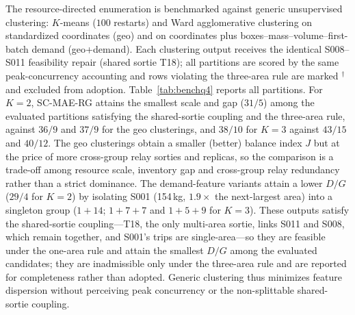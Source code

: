\documentclass[journal]{IEEEtran}
\begin{document}
The resource-directed enumeration is benchmarked against generic unsupervised
clustering: $K$-means ($100$ restarts) and Ward agglomerative clustering on
standardized coordinates (geo) and on coordinates plus
boxes--mass--volume--first-batch demand (geo+demand). Each clustering output
receives the identical S008--S011 feasibility repair (shared sortie T18);
all partitions are scored by the same peak-concurrency accounting and rows
violating the three-area rule are marked
$^{\dagger}$ and excluded from adoption.
Table~\ref{tab:benchq4} reports all partitions. For $K{=}2$,
SC-MAE-RG attains the smallest scale and gap ($31/5$) among the evaluated
partitions satisfying the shared-sortie coupling and the three-area rule,
against $36/9$ and $37/9$ for the geo
clusterings, and $38/10$ for $K{=}3$ against $43/15$ and $40/12$. The geo
clusterings obtain a smaller (better) balance index $J$ but at the price of more
cross-group relay sorties and replicas, so the comparison is a trade-off among
resource scale, inventory gap and cross-group relay redundancy rather than a
strict dominance. The demand-feature variants attain a lower $D/G$
($29/4$ for $K{=}2$) by isolating
S001 (154\,kg, $1.9\times$ the next-largest area) into a
singleton group ($1{+}14$; $1{+}7{+}7$ and $1{+}5{+}9$ for
$K{=}3$). These outputs satisfy the shared-sortie coupling---T18, the only
multi-area sortie, links S011 and S008, which remain together, and S001's
trips are single-area---so they are feasible under the one-area rule and
attain the smallest $D/G$ among the evaluated candidates; they are inadmissible
only under the three-area rule
and are reported for completeness rather than adopted. Generic clustering thus
minimizes feature dispersion without
perceiving peak concurrency or the non-splittable shared-sortie coupling.
\end{document}
